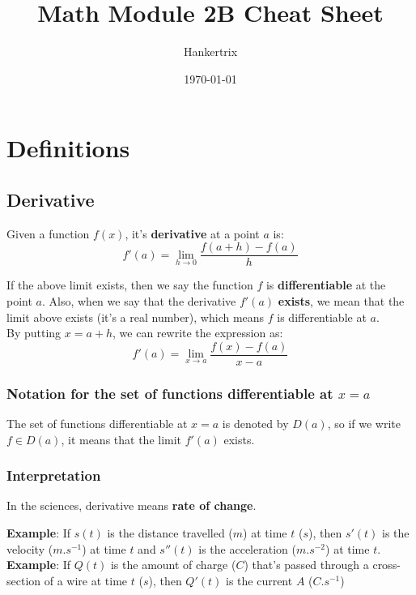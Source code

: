\documentclass[11pt]{article}
\author{Hankertrix}
\date{\today}
\title{Math Module 2B Cheat Sheet}
\begin{document}
\maketitle
\setcounter{tocdepth}{2}
\tableofcontents

\newpage

\section{Definitions}
\label{sec:org931b215}

\subsection{Derivative}
\label{sec:org5aeb9c0}
Given a function \(f(x)\), it's \textbf{derivative} at a point \(a\) is:
\[f'(a) = \lim_{h \rightarrow 0} \frac{f(a + h) - f(a)}{h}\]

If the above limit exists, then we say the function \(f\) is \textbf{differentiable} at the point \(a\). Also, when we say that the derivative \(f'(a)\) \textbf{exists}, we mean that the limit above exists (it's a real number), which means \(f\) is differentiable at \(a\).
\\[0pt]

By putting \(x = a + h\), we can rewrite the expression as:
\[f'(a) = \lim_{x \rightarrow a} \frac{f(x) - f(a)}{x - a}\]

\subsubsection{Notation for the set of functions differentiable at \(x = a\)}
\label{sec:org447e536}
The set of functions differentiable at \(x = a\) is denoted by \(D(a)\), so if we write \(f \in D(a)\), it means that the limit \(f'(a)\) exists.

\subsubsection{Interpretation}
\label{sec:orgb6effb9}
In the sciences, derivative means \textbf{rate of change}.

\textbf{Example}: If \(s(t)\) is the distance travelled (\(\unit{m}\)) at time \(t\) (\(\unit{s}\)), then \(s'(t)\) is the velocity (\(\unit{m.s^{-1}}\)) at time \(t\) and \(s''(t)\) is the acceleration (\(\unit{m.s^{-2}}\)) at time \(t\).
\\[0pt]

\textbf{Example}: If \(Q(t)\) is the amount of charge (\(\unit{C}\)) that's passed through a cross-section of a wire at time \(t\) (\(\unit{s}\)), then \(Q'(t)\) is the current \(A\) (\(\unit{C.s^{-1}}\))
\end{document}
